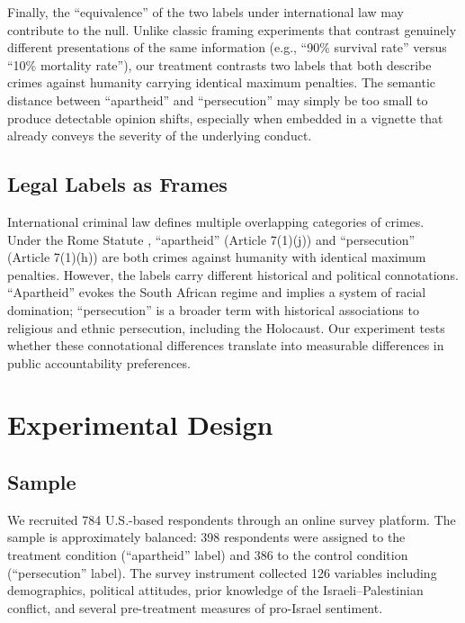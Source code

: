 \documentclass[12pt]{article}
\begin{document}
Finally, the ``equivalence'' of the two labels under international law may contribute to the null. Unlike classic framing experiments that contrast genuinely different presentations of the same information (e.g., ``90\% survival rate'' versus ``10\% mortality rate''), our treatment contrasts two labels that both describe crimes against humanity carrying identical maximum penalties. The semantic distance between ``apartheid'' and ``persecution'' may simply be too small to produce detectable opinion shifts, especially when embedded in a vignette that already conveys the severity of the underlying conduct.

\subsection{Legal Labels as Frames}

International criminal law defines multiple overlapping categories of crimes. Under the Rome Statute \citep{icc2002rome}, ``apartheid'' (Article 7(1)(j)) and ``persecution'' (Article 7(1)(h)) are both crimes against humanity with identical maximum penalties. However, the labels carry different historical and political connotations. ``Apartheid'' evokes the South African regime and implies a system of racial domination; ``persecution'' is a broader term with historical associations to religious and ethnic persecution, including the Holocaust. Our experiment tests whether these connotational differences translate into measurable differences in public accountability preferences.

\section{Experimental Design}
\label{sec:design}

\subsection{Sample}

We recruited 784 U.S.-based respondents through an online survey platform. The sample is approximately balanced: 398 respondents were assigned to the treatment condition (``apartheid'' label) and 386 to the control condition (``persecution'' label). The survey instrument collected 126 variables including demographics, political attitudes, prior knowledge of the Israeli--Palestinian conflict, and several pre-treatment measures of pro-Israel sentiment.
\end{document}
